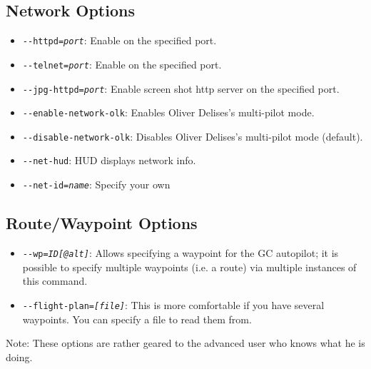 \subsection{Network Options}
\begin{itemize}
\item{\texttt{-$ $-httpd={\it port}}}: Enable  on the specified port.
\item{\texttt{-$ $-telnet={\it port}}}: Enable  on the specified port.
\item{\texttt{-$ $-jpg-httpd={\it port}}}: Enable screen shot http server on the specified port.
\item{\texttt{-$ $-enable-network-olk}}: Enables Oliver Delises's multi-pilot mode.
\item{\texttt{-$ $-disable-network-olk}}: Disables Oliver Delises's multi-pilot mode (default).
\item{\texttt{-$ $-net-hud}}: HUD displays network info.
\item{\texttt{-$ $-net-id={\it name}}}: Specify your own 
 \end{itemize}
\subsection{Route/Waypoint Options}
\begin{itemize}
\item{\texttt{-$ $-wp={\it ID[@alt]}}}: Allows specifying a waypoint for the GC autopilot; it
is possible to specify multiple waypoints (i.e. a route) via multiple instances of this
command.
\item{\texttt{-$ $-flight-plan={\it [file]}}}: This is more comfortable if
you have several waypoints. You can  specify a file to read them from.
\end{itemize}

Note: These options are rather geared to the advanced user who knows what he is doing. 

